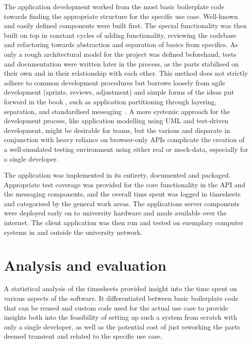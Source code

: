 The application development worked from the most basic boilerplate code towards finding the appropriate structure for the specific use case.
Well-known and easily defined components were built first. The special functionality was then built on top in constant cycles of adding functionality, reviewing the codebase and refactoring towards abstraction and separation of basics from specifics.
As only a rough architectural model for the project was defined beforehand, tests and documentation were written later in the process, as the parts stabilised on their own and in their relationship with each other.
This method does not strictly adhere to common development procedures but borrows loosely from agile development (sprints, reviews, adjustment) and simple forms of the ideas put forward in the book , such as application partitioning through layering, separation, and standardised messaging~\parencite{patternOrientedSoftwareArchitecture}.
A more systemic approach for the development process, like application modelling using \ac{UML} and test-driven development, might be desirable for teams, but the various and disparate  in conjunction with heavy reliance on browser-only \ac{API}s complicate the creation of a well-simulated testing environment using either real or mock-data, especially for a single developer.

The application was implemented in its entirety, documented and packaged.
Appropriate test coverage was provided for the core functionality in the API and the messaging components, and the overall time spent was logged in timesheets and categorised by the general work areas.
The application\textquotesingle s server components were deployed early on to university hardware and made available over the internet.
The client application was then run and tested on exemplary computer systems in and outside the university network.

\section{Analysis and evaluation}
\label{sec:analysis-evaluation}

A statistical analysis of the timesheets provided insight into the time spent on various aspects of the software.
It differentiated between basic boilerplate code that can be reused and custom code used for the actual use case to provide insights both into the feasibility of setting up such a system from scratch with only a single developer, as well as the potential cost of just reworking the parts deemed transient and related to the specific use case.


